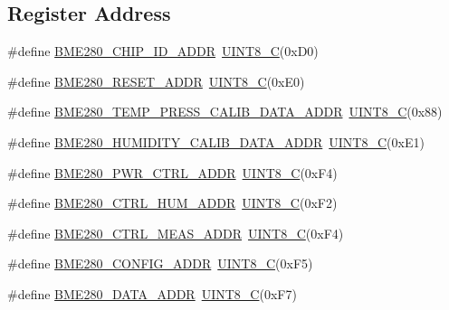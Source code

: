 \subsection*{Register Address}
\begin{DoxyCompactItemize}
\item 
\#define \hyperlink{group___b_m_e280_gafc2c2e977533781c8fad2dc1a9408b4e}{B\+M\+E280\+\_\+\+C\+H\+I\+P\+\_\+\+I\+D\+\_\+\+A\+D\+DR}~\hyperlink{group___b_m_e280_gacd2aa09844a8a245cf7fdbb808e215e5}{U\+I\+N\+T8\+\_\+C}(0x\+D0)
\item 
\#define \hyperlink{group___b_m_e280_ga946f939c2dda53735f06cb86abb216e4}{B\+M\+E280\+\_\+\+R\+E\+S\+E\+T\+\_\+\+A\+D\+DR}~\hyperlink{group___b_m_e280_gacd2aa09844a8a245cf7fdbb808e215e5}{U\+I\+N\+T8\+\_\+C}(0x\+E0)
\item 
\#define \hyperlink{group___b_m_e280_ga312afdb80e73c77393ea9aac287b42f5}{B\+M\+E280\+\_\+\+T\+E\+M\+P\+\_\+\+P\+R\+E\+S\+S\+\_\+\+C\+A\+L\+I\+B\+\_\+\+D\+A\+T\+A\+\_\+\+A\+D\+DR}~\hyperlink{group___b_m_e280_gacd2aa09844a8a245cf7fdbb808e215e5}{U\+I\+N\+T8\+\_\+C}(0x88)
\item 
\#define \hyperlink{group___b_m_e280_gab3deba49b93318f0daa9e9aa238d8299}{B\+M\+E280\+\_\+\+H\+U\+M\+I\+D\+I\+T\+Y\+\_\+\+C\+A\+L\+I\+B\+\_\+\+D\+A\+T\+A\+\_\+\+A\+D\+DR}~\hyperlink{group___b_m_e280_gacd2aa09844a8a245cf7fdbb808e215e5}{U\+I\+N\+T8\+\_\+C}(0x\+E1)
\item 
\#define \hyperlink{group___b_m_e280_ga98ddb9dc59edd34aa1d9ea44a05feb7b}{B\+M\+E280\+\_\+\+P\+W\+R\+\_\+\+C\+T\+R\+L\+\_\+\+A\+D\+DR}~\hyperlink{group___b_m_e280_gacd2aa09844a8a245cf7fdbb808e215e5}{U\+I\+N\+T8\+\_\+C}(0x\+F4)
\item 
\#define \hyperlink{group___b_m_e280_ga8f090989bb45d85c2605e4a86a49b46d}{B\+M\+E280\+\_\+\+C\+T\+R\+L\+\_\+\+H\+U\+M\+\_\+\+A\+D\+DR}~\hyperlink{group___b_m_e280_gacd2aa09844a8a245cf7fdbb808e215e5}{U\+I\+N\+T8\+\_\+C}(0x\+F2)
\item 
\#define \hyperlink{group___b_m_e280_ga53b7ccb8b940a9bdd861a7722732c9cc}{B\+M\+E280\+\_\+\+C\+T\+R\+L\+\_\+\+M\+E\+A\+S\+\_\+\+A\+D\+DR}~\hyperlink{group___b_m_e280_gacd2aa09844a8a245cf7fdbb808e215e5}{U\+I\+N\+T8\+\_\+C}(0x\+F4)
\item 
\#define \hyperlink{group___b_m_e280_ga7c2fa57fdeb63ca2c255432f4c98298e}{B\+M\+E280\+\_\+\+C\+O\+N\+F\+I\+G\+\_\+\+A\+D\+DR}~\hyperlink{group___b_m_e280_gacd2aa09844a8a245cf7fdbb808e215e5}{U\+I\+N\+T8\+\_\+C}(0x\+F5)
\item 
\#define \hyperlink{group___b_m_e280_ga1bcfa4087dcd9ca9af43fce23de8eaf2}{B\+M\+E280\+\_\+\+D\+A\+T\+A\+\_\+\+A\+D\+DR}~\hyperlink{group___b_m_e280_gacd2aa09844a8a245cf7fdbb808e215e5}{U\+I\+N\+T8\+\_\+C}(0x\+F7)
\end{DoxyCompactItemize}
